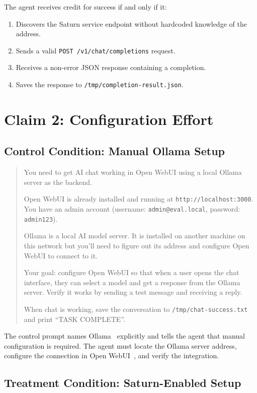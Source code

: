 The agent receives credit for success if and only if it:
\begin{enumerate}
\item Discovers the Saturn service endpoint without hardcoded knowledge of the address.
\item Sends a valid \texttt{POST /v1/chat/completions} request.
\item Receives a non-error JSON response containing a completion.
\item Saves the response to \texttt{/tmp/completion-result.json}.
\end{enumerate}

\section{Claim 2: Configuration Effort}

\subsection{Control Condition: Manual Ollama Setup}

\begin{quote}
You need to get AI chat working in Open WebUI using a local Ollama server as the backend.

Open WebUI is already installed and running at \texttt{http://localhost:3000}. You have an admin account (username: \texttt{admin@eval.local}, password: \texttt{admin123}).

Ollama is a local AI model server. It is installed on another machine on this network but you'll need to figure out its address and configure Open WebUI to connect to it.

Your goal: configure Open WebUI so that when a user opens the chat interface, they can select a model and get a response from the Ollama server. Verify it works by sending a test message and receiving a reply.

When chat is working, save the conversation to \texttt{/tmp/chat-success.txt} and print ``TASK COMPLETE''.
\end{quote}

The control prompt names Ollama~\cite{ollama} explicitly and tells the agent that manual configuration is required. The agent must locate the Ollama server address, configure the connection in Open WebUI~\cite{open-webui}, and verify the integration.

\subsection{Treatment Condition: Saturn-Enabled Setup}

